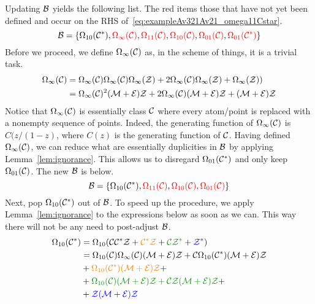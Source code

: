 \documentclass[12pt, a4paper, twoside]{report}
\begin{document}
Updating $\mathcal{B}$ yields the following list. The red items those that have not yet been defined and occur on the RHS of~\eqref{eq:exampleAv321Av21_omega11Cstar}.
$$\mathcal{B} = \{\Omega_{10}(\mathcal{C}^*),\textcolor{red}{\Omega_\infty(\mathcal{C})}, \textcolor{red}{\Omega_{11}(\mathcal{C})},\textcolor{red}{\Omega_{10}(\mathcal{C})}, \textcolor{red}{\Omega_{01}(\mathcal{C})}, \textcolor{red}{\Omega_{01}(\mathcal{C}^*)}\}$$
Before we proceed, we define $\Omega_\infty(\mathcal{C})$ as, in the scheme of things, it is a trivial task.
\begin{align}
  \begin{aligned}
    \Omega_\infty(\mathcal{C}) &= \Omega_\infty(\mathcal{C})\Omega_\infty(\mathcal{C})\Omega_\infty(\mathcal{Z}) + 2\Omega_\infty(\mathcal{C})\Omega_\infty(\mathcal{Z}) + \Omega_\infty(\mathcal{Z}))\\
    &= \Omega_\infty(\mathcal{C})^2(\mathcal{M}+\mathcal{E})\mathcal{Z} + 2\Omega_\infty(\mathcal{C})(\mathcal{M}+\mathcal{E})\mathcal{Z} + (\mathcal{M}+\mathcal{E})\mathcal{Z}
  \end{aligned}
  \label{eq:exampleAv321Av21_omegainftyC}
\end{align}
Notice that $\Omega_\infty(\mathcal{C})$ is essentially class $\mathcal{C}$ where every atom/point is replaced with a nonempty sequence of points. Indeed, the generating function of $\Omega_\infty(\mathcal{C})$ is $C(z/(1-z)$, where $C(z)$ is the generating function of $\mathcal{C}$. Having defined $\Omega_\infty(\mathcal{C})$, we can reduce what are essentially duplicities in $\mathcal{B}$ by applying Lemma~\ref{lem:ignorance}. This allows us to disregard $\Omega_{01}(\mathcal{C}^*)$ and only keep $\Omega_{01}(\mathcal{C})$. The new $\mathcal{B}$ is below.
$$\mathcal{B} = \{\Omega_{10}(\mathcal{C}^*), \textcolor{red}{\Omega_{11}(\mathcal{C})},\textcolor{red}{\Omega_{10}(\mathcal{C})}, \textcolor{red}{\Omega_{01}(\mathcal{C})}\}$$
Next, pop $\Omega_{10}(\mathcal{C}^*)$ out of $\mathcal{B}$. To speed up the procedure, we apply Lemma~\ref{lem:ignorance} to the expressions below as soon as we can. This way there will not be any need to post-adjust $\mathcal{B}$. 
\begin{align}
  \begin{aligned}
  \Omega_{10}(\Cstar) &= \Omega_{10}(\C\Cstar\Z + \textcolor{orange}{\Cstar\Z} + \textcolor{green}{\C\Z^*} + \textcolor{blue}{\Z^*})\\
                      &= \Omega_{10}(\C)\Omega_\infty(\C)(\M+\EE)\Z + \C\Omega_{10}(\Cstar)(\M+\EE)\Z\\ %
                      &+\textcolor{orange}{\Omega_{10}(\Cstar)(\M+\EE)\Z}+\\ %
                      &+\textcolor{green}{\Omega_{10}(\C)(\M+\EE)\Z + \C\Z(\M+\EE)\Z} +\\
                      &+\textcolor{blue}{\Z(\M+\EE)\Z}
                    \end{aligned}
                        \label{eq:exampleAv321Av21_omega10Cstar}
\end{align}
\end{document}
